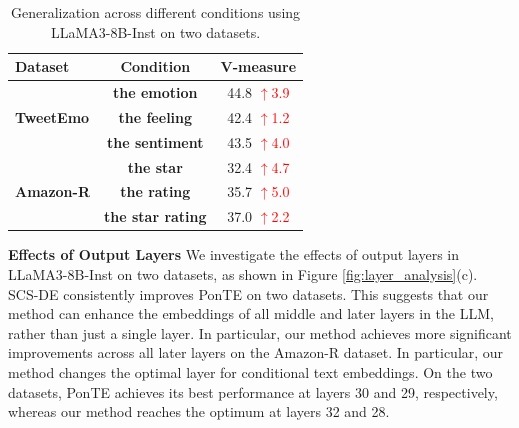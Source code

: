 \documentclass[11pt]{article}
\newcommand{\up}[1]{\textcolor{red}{{$\uparrow$#1}}}
\begin{document}
\begin{table}[t] \small
    \centering
    \setlength{\tabcolsep}{8pt}
    \begin{tabular}{lcc}
        \toprule
        \textbf{Dataset} & \textbf{Condition} & \textbf{V-measure} \\
        \midrule
        \multirow{3}{*}{\textbf{TweetEmo}} 
        & \textbf{the emotion}  & 44.8 \up{3.9}  \\
        & \textbf{the feeling} &42.4 \up{1.2}  \\
        & \textbf{the sentiment} &43.5 \up{4.0}  \\
        \midrule
        \multirow{3}{*}{\textbf{Amazon-R}}
        & \textbf{the star} &32.4 \up{4.7} \\
        & \textbf{the rating}  &35.7 \up{5.0}   \\
        & \textbf{the star rating}  &37.0 \up{2.2}   \\
        \bottomrule
    \end{tabular}
    \caption{Generalization across different conditions using LLaMA3-8B-Inst on two datasets.}
    \label{tab:condition}
\end{table}


\textbf{Effects of Output Layers}
We investigate the effects of output layers in LLaMA3-8B-Inst on two datasets, as shown in Figure \ref{fig:layer_analysis}(c).
SCS-DE consistently improves PonTE on two datasets.
This suggests that our method can enhance the embeddings of all middle and later layers in the LLM, rather than just a single layer.
In particular, our method achieves more significant improvements across all later layers on the Amazon-R dataset.
In particular, our method changes the optimal layer for conditional text embeddings. On the two datasets, PonTE achieves its best performance at layers 30 and 29, respectively, whereas our method reaches the optimum at layers 32 and 28.
\end{document}
